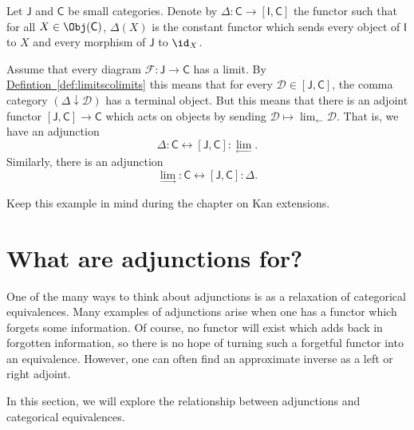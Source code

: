 \documentclass[notes.tex]{subfiles}
\begin{document}
\begin{example}
  Let $\mathsf{J}$ and $\mathsf{C}$ be small categories. Denote by $\Delta\colon \mathsf{C} \to [\mathsf{I}, \mathsf{C}]$ the functor such that for all $X \in \Obj(\mathsf{C})$, $\Delta(X)$ is the constant functor which sends every object of $\mathsf{I}$ to $X$ and every morphism of $\mathsf{J}$ to $\id_{X}$.

  Assume that every diagram $\mathcal{F}\colon \mathsf{J} \to \mathsf{C}$ has a limit. By \hyperref[def:limitscolimits]{Defintion~\ref*{def:limitscolimits}} this means that for every $\mathcal{D} \in [\mathsf{J}, \mathsf{C}]$, the comma category $(\Delta \downarrow \mathcal{D})$ has a terminal object. But this means that there is an adjoint functor $[\mathsf{J}, \mathsf{C}] \to \mathsf{C}$ which acts on objects by sending $\mathcal{D} \mapsto \lim_{\leftarrow} \mathcal{D}$. That is, we have an adjunction
  \begin{equation*}
    \Delta : \mathsf{C} \leftrightarrow [\mathsf{J}, \mathsf{C}] : \lim_{\leftarrow}.
  \end{equation*}
  Similarly, there is an adjunction
  \begin{equation*}
    \lim_{\rightarrow} : \mathsf{C} \leftrightarrow [\mathsf{J}, \mathsf{C}] : \Delta.
  \end{equation*}
\end{example}

Keep this example in mind during the chapter on Kan extensions.

\section{What are adjunctions for?}
\label{sec:what_are_adjunctions_for}

One of the many ways to think about adjunctions is as a relaxation of categorical equivalences. Many examples of adjunctions arise when one has a functor which forgets some information. Of course, no functor will exist which adds back in forgotten information, so there is no hope of turning such a forgetful functor into an equivalence. However, one can often find an approximate inverse as a left or right adjoint.

In this section, we will explore the relationship between adjunctions and categorical equivalences.
\end{document}
